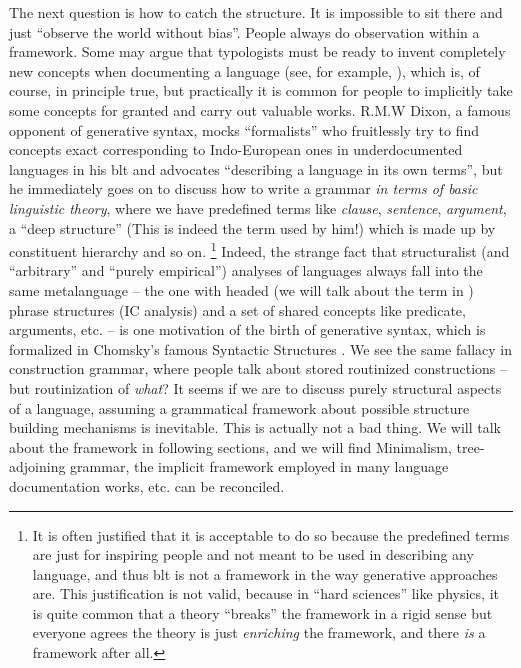 \documentclass[../main.tex]{subfiles}
\begin{document}
The next question is how to catch the structure. It is impossible to sit there and just ``observe the world without bias''. People always do observation within a 
framework. Some may argue that typologists must be ready to invent completely new concepts when documenting 
a language (see, for example, \citet{haspelmath2008framework}), which is, of course, in principle true, 
but practically it is common for people to implicitly take some concepts for granted and carry out 
valuable works. R.M.W Dixon, a famous opponent of generative syntax, mocks ``formalists'' who fruitlessly try 
to find concepts exact corresponding to Indo-European ones in underdocumented languages in his 
\ac{blt} \citep{dixon2009basic} and advocates ``describing a language in its own terms'',
but he immediately goes on to discuss how to write a grammar \emph{in terms of basic linguistic theory},
where we have predefined terms like \emph{clause}, \emph{sentence}, \emph{argument}, a ``deep structure''
(This is indeed the term used by him!) which is made up by constituent hierarchy and so on. %
\footnote{
    It is often justified that it is acceptable to do so because the predefined terms are just for inspiring 
    people and not meant to be used in describing any language, and thus \ac{blt} is not a framework in the way generative approaches are. This justification is not valid, because in 
    ``hard sciences'' like physics, it is quite common that a theory ``breaks'' the framework in a rigid sense 
    but everyone agrees the theory is just \emph{enriching} the framework, and there \emph{is} a framework after all.
}%
Indeed, the strange fact that structuralist (and ``arbitrary'' and ``purely empirical'') analyses of 
languages always fall into the same metalanguage -- the one with headed (we will talk about the term in 
) phrase structures (IC analysis) and a set of shared concepts like predicate, 
arguments, etc. -- is one motivation of the birth of generative syntax, which is formalized in Chomsky's 
famous Syntactic Structures \citep{chomsky2009syntactic}. We see the same fallacy in construction grammar,
where people talk about stored routinized constructions -- but routinization of \emph{what}? 
It seems if we are to discuss purely structural aspects of a language, assuming a grammatical framework 
about possible structure building mechanisms is inevitable. This is actually not a bad thing. We will 
talk about the framework in following sections, and we will find Minimalism, tree-adjoining
grammar, the implicit framework employed in many language documentation works, etc. can be reconciled.
\end{document}
